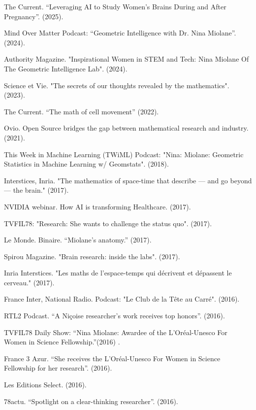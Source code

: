 The Current. “Leveraging AI to Study Women’s Brains During and After Pregnancy”. (2025).

Mind Over Matter Podcast: “Geometric Intelligence with Dr. Nina Miolane”. (2024).

Authority Magazine. "Inspirational Women in STEM and Tech: Nina Miolane Of The Geometric Intelligence Lab". (2024).

Science et Vie. "The secrets of our thoughts revealed by the mathematics". (2023).

The Current. “The math of cell movement” (2022).

Ovio. Open Source bridges the gap between mathematical research and industry. (2021).

This Week in Machine Learning (TWiML) Podcast: "Nina: Miolane: Geometric Statistics in Machine Learning w/ Geomstats". (2018).

Interstices, Inria. "The mathematics of space-time that describe — and go beyond — the brain." (2017).

NVIDIA webinar. How AI is transforming Healthcare. (2017).

TVFIL78: "Research: She wants to challenge the status quo". (2017).

Le Monde. Binaire. “Miolane’s anatomy.” (2017).

Spirou Magazine. "Brain research: inside the labs". (2017).

Inria Interstices. "Les maths de l'espace-temps qui décrivent et dépassent le cerveau." (2017).

France Inter, National Radio. Podcast: "Le Club de la Tête au Carré". (2016). 

RTL2 Podcast. “A Niçoise researcher’s work receives top honors”. (2016).

TVFIL78 Daily Show: “Nina Miolane: Awardee of the L’Oréal-Unesco For Women in Science Fellowship.”(2016) .

France 3 Azur. “She receives the L’Oréal-Unesco For Women in Science Fellowship for her research”. (2016).

Les Editions Select. (2016).

78actu. “Spotlight on a clear-thinking researcher”. (2016).
